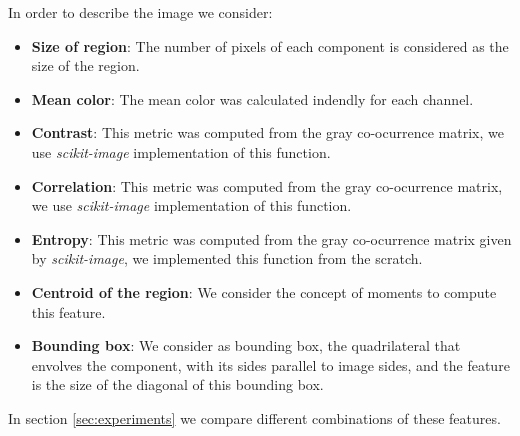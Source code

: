 In order to describe the image we consider:

\begin{itemize}
\item \textbf{Size of region}: The number of pixels of each component is considered as the size of the region.
\item \textbf{Mean color}: The mean color was calculated indendly for each channel.
\item \textbf{Contrast}: This metric was computed from the gray co-ocurrence matrix, we use \textit{scikit-image} implementation of this function.
\item \textbf{Correlation}: This metric was computed from the gray co-ocurrence matrix, we use \textit{scikit-image} implementation of this function.
\item \textbf{Entropy}: This metric was computed from the gray co-ocurrence matrix given by \textit{scikit-image}, we implemented this function from the scratch.
\item \textbf{Centroid of the region}: We consider the concept of moments to compute this feature.
\item \textbf{Bounding box}: We consider as bounding box, the quadrilateral that envolves the component, with its sides parallel to image sides, and the feature is the size of the diagonal of this bounding box.
\end{itemize}

In section \ref{sec:experiments} we compare different combinations of these features.


